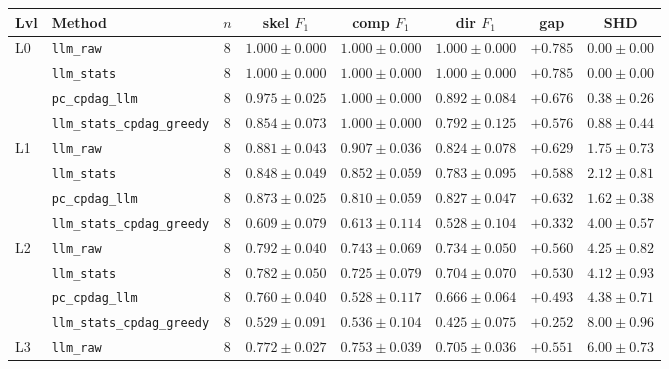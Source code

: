 \begin{center}
\scriptsize
\setlength{\tabcolsep}{3.0pt}
\begin{tabular}{@{}l l c c c c c c@{}}
\toprule
Lvl & Method & $n$ & skel $F_1$ & comp $F_1$ & dir $F_1$ & gap & SHD \\
\midrule
L0 & \texttt{llm\_raw}                & 8 & $1.000 \pm 0.000$ & $1.000 \pm 0.000$ & $1.000 \pm 0.000$ & $+0.785$ & $0.00 \pm 0.00$ \\
   & \texttt{llm\_stats}              & 8 & $1.000 \pm 0.000$ & $1.000 \pm 0.000$ & $1.000 \pm 0.000$ & $+0.785$ & $0.00 \pm 0.00$ \\
   & \texttt{pc\_cpdag\_llm}          & 8 & $0.975 \pm 0.025$ & $1.000 \pm 0.000$ & $0.892 \pm 0.084$ & $+0.676$ & $0.38 \pm 0.26$ \\
   & \texttt{llm\_stats\_cpdag\_greedy} & 8 & $0.854 \pm 0.073$ & $1.000 \pm 0.000$ & $0.792 \pm 0.125$ & $+0.576$ & $0.88 \pm 0.44$ \\
\midrule
L1 & \texttt{llm\_raw}                & 8 & $0.881 \pm 0.043$ & $0.907 \pm 0.036$ & $0.824 \pm 0.078$ & $+0.629$ & $1.75 \pm 0.73$ \\
   & \texttt{llm\_stats}              & 8 & $0.848 \pm 0.049$ & $0.852 \pm 0.059$ & $0.783 \pm 0.095$ & $+0.588$ & $2.12 \pm 0.81$ \\
   & \texttt{pc\_cpdag\_llm}          & 8 & $0.873 \pm 0.025$ & $0.810 \pm 0.059$ & $0.827 \pm 0.047$ & $+0.632$ & $1.62 \pm 0.38$ \\
   & \texttt{llm\_stats\_cpdag\_greedy} & 8 & $0.609 \pm 0.079$ & $0.613 \pm 0.114$ & $0.528 \pm 0.104$ & $+0.332$ & $4.00 \pm 0.57$ \\
\midrule
L2 & \texttt{llm\_raw}                & 8 & $0.792 \pm 0.040$ & $0.743 \pm 0.069$ & $0.734 \pm 0.050$ & $+0.560$ & $4.25 \pm 0.82$ \\
   & \texttt{llm\_stats}              & 8 & $0.782 \pm 0.050$ & $0.725 \pm 0.079$ & $0.704 \pm 0.070$ & $+0.530$ & $4.12 \pm 0.93$ \\
   & \texttt{pc\_cpdag\_llm}          & 8 & $0.760 \pm 0.040$ & $0.528 \pm 0.117$ & $0.666 \pm 0.064$ & $+0.493$ & $4.38 \pm 0.71$ \\
   & \texttt{llm\_stats\_cpdag\_greedy} & 8 & $0.529 \pm 0.091$ & $0.536 \pm 0.104$ & $0.425 \pm 0.075$ & $+0.252$ & $8.00 \pm 0.96$ \\
\midrule
L3 & \texttt{llm\_raw}                & 8 & $0.772 \pm 0.027$ & $0.753 \pm 0.039$ & $0.705 \pm 0.036$ & $+0.551$ & $6.00 \pm 0.73$ \\

\end{tabular}
\end{center}
